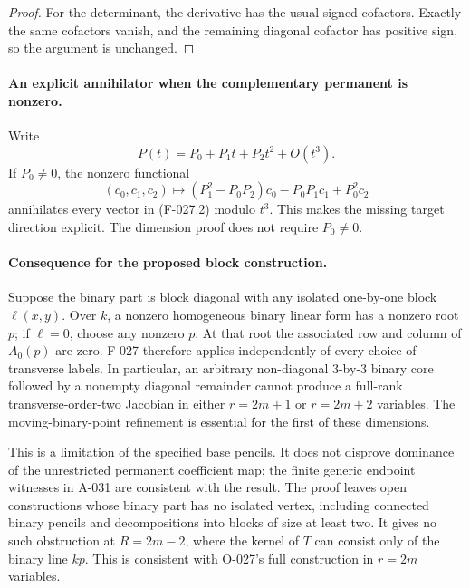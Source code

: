 \begin{proof}
For the determinant, the derivative has the usual signed
cofactors. Exactly the same cofactors vanish, and the
remaining diagonal cofactor has positive sign, so the
argument is unchanged.
\end{proof}

\paragraph{An explicit annihilator when the complementary permanent is nonzero.}
Write
\[
                    P(t)=P_0+P_1t+P_2t^2+O(t^3).
\]
If \(P_0\ne0\), the nonzero functional
\[
 (c_0,c_1,c_2)\longmapsto
       (P_1^2-P_0P_2)c_0-P_0P_1c_1+P_0^2c_2
                                                               \tag{F-027.4}
\]
annihilates every vector in (F-027.2) modulo \(t^3\).
This makes the missing target direction explicit.
The dimension proof does not require \(P_0\ne0\).

\paragraph{Consequence for the proposed block construction.}
Suppose the binary part is block diagonal with any isolated
one-by-one block \(\ell(x,y)\). Over \(k\), a nonzero
homogeneous binary linear form has a nonzero root \(p\);
if \(\ell=0\), choose any nonzero \(p\).
At that root the associated row and column of \(A_0(p)\)
are zero. F-027 therefore applies independently of every
choice of transverse labels.
In particular, an arbitrary non-diagonal \(3\)-by-\(3\)
binary core followed by a nonempty diagonal remainder
cannot produce a full-rank transverse-order-two Jacobian
in either \(r=2m+1\) or \(r=2m+2\) variables.
The moving-binary-point refinement is essential for
the first of these dimensions.

This is a limitation of the specified base pencils.
It does not disprove dominance of the unrestricted
permanent coefficient map; the finite generic endpoint
witnesses in A-031 are consistent with the result.
The proof leaves open constructions whose binary part
has no isolated vertex, including connected binary
pencils and decompositions into blocks of size at least
two. It gives no such obstruction at \(R=2m-2\),
where the kernel of \(T\) can consist only of the
binary line \(kp\). This is consistent with O-027's
full construction in \(r=2m\) variables.

